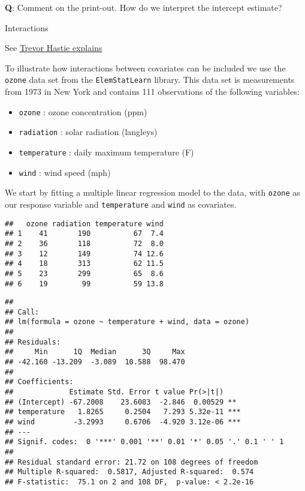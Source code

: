 \documentclass[ignorenonframetext,]{beamer}
\providecommand{\tightlist}{%
  \setlength{\itemsep}{0pt}\setlength{\parskip}{0pt}}
\begin{document}
\begin{frame}[fragile]
\textbf{Q}: Comment on the print-out. How do we interpret the intercept
estimate?

\end{frame}

\begin{frame}[fragile]

\begin{block}{Interactions}

See
\href{https://www.youtube.com/watch?v=IFzVxLv0TKQ\&list=PL5-da3qGB5IBSSCPANhTgrw82ws7w_or9\&index=5}{Trevor
Hastie explains}

To illustrate how interactions between covariates can be included we use
the \texttt{ozone} data set from the \texttt{ElemStatLearn} library.
This data set is measurements from 1973 in New York and contains 111
observations of the following variables:

\begin{itemize}
\tightlist
\item
  \texttt{ozone} : ozone concentration (ppm)
\item
  \texttt{radiation} : solar radiation (langleys)
\item
  \texttt{temperature} : daily maximum temperature (F)
\item
  \texttt{wind} : wind speed (mph)
\end{itemize}

We start by fitting a multiple linear regression model to the data, with
\texttt{ozone} as our response variable and \texttt{temperature} and
\texttt{wind} as covariates.

\begin{verbatim}
##   ozone radiation temperature wind
## 1    41       190          67  7.4
## 2    36       118          72  8.0
## 3    12       149          74 12.6
## 4    18       313          62 11.5
## 5    23       299          65  8.6
## 6    19        99          59 13.8
\end{verbatim}

\end{block}

\end{frame}

\begin{frame}[fragile]

\small

\begin{verbatim}
## 
## Call:
## lm(formula = ozone ~ temperature + wind, data = ozone)
## 
## Residuals:
##     Min      1Q  Median      3Q     Max 
## -42.160 -13.209  -3.089  10.588  98.470 
## 
## Coefficients:
##             Estimate Std. Error t value Pr(>|t|)    
## (Intercept) -67.2008    23.6083  -2.846  0.00529 ** 
## temperature   1.8265     0.2504   7.293 5.32e-11 ***
## wind         -3.2993     0.6706  -4.920 3.12e-06 ***
## ---
## Signif. codes:  0 '***' 0.001 '**' 0.01 '*' 0.05 '.' 0.1 ' ' 1
## 
## Residual standard error: 21.72 on 108 degrees of freedom
## Multiple R-squared:  0.5817, Adjusted R-squared:  0.574 
## F-statistic:  75.1 on 2 and 108 DF,  p-value: < 2.2e-16
\end{verbatim}

\normalsize

\end{frame}
\end{document}
